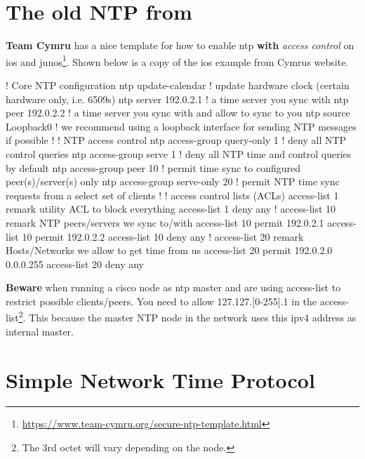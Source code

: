 
\section{The old NTP from }

\textbf{Team Cymru} has a nice template for how to enable \gls{ntp} \textbf{with} \textit{access control} on \gls{ios} and \gls{junos}\footnote{\url{https://www.team-cymru.org/secure-ntp-template.html}}. Shown below is a copy of the \gls{ios} example from Cymrus website.

\begin{cisco}
	! Core NTP configuration
	ntp update-calendar             ! update hardware clock (certain hardware only, i.e. 6509s)
	ntp server 192.0.2.1            ! a time server you sync with
	ntp peer   192.0.2.2            ! a time server you sync with and allow to sync to you
	ntp source Loopback0            ! we recommend using a loopback interface for sending NTP messages if possible
	!
	! NTP access control
	ntp access-group query-only 1   ! deny all NTP control queries
	ntp access-group serve 1        ! deny all NTP time and control queries by default
	ntp access-group peer 10        ! permit time sync to configured peer(s)/server(s) only
	ntp access-group serve-only 20  ! permit NTP time sync requests from a select set of clients
	!
	! access control lists (ACLs)
	access-list 1 remark utility ACL to block everything
	access-list 1 deny any
	!
	access-list 10 remark NTP peers/servers we sync to/with
	access-list 10 permit 192.0.2.1
	access-list 10 permit 192.0.2.2
	access-list 10 deny any
	!
	access-list 20 remark Hosts/Networks we allow to get time from us
	access-list 20 permit 192.0.2.0 0.0.0.255
	access-list 20 deny any
\end{cisco}

\textbf{Beware} when running a cisco node as \gls{ntp} master and are using access-list to restrict possible clients/peers. You need to allow 127.127.[0-255].1 in the access-list\footnote{The 3rd octet will vary depending on the node.}. This because the master NTP node in the network uses this \gls{ipv4} address as internal master.

\section[SNTP]{Simple Network Time Protocol}

